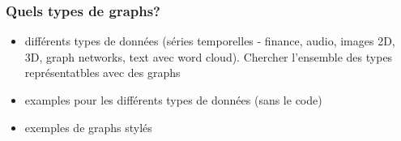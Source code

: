 \begin{frame}\frametitle{Quels types de graphs?}
   \begin{itemize}
      \item différents types de données (séries temporelles - finance, audio, images 2D, 3D, graph networks, text avec word cloud). Chercher l'ensemble des types représentatbles avec des graphs
      \item examples pour les différents types de données (sans le code)
      \item exemples de graphs stylés
   \end{itemize}
\end{frame}



